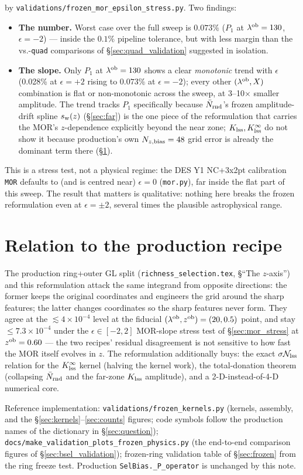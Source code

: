 \documentclass[a4paper, 11pt]{article}
\newcommand{\lob}{\lambda^{\rm ob}}
\newcommand{\zob}{z^{\rm ob}}
\newcommand{\Ncal}{\mathcal{N}}
\newcommand{\Nbar}{\bar{N}_{\rm rnd}}
\newcommand{\Klss}{K_{\rm lss}}
\newcommand{\KlssInf}{K_{\rm lss}^{\infty}}
\begin{document}
by \texttt{validations/frozen\_mor\_epsilon\_stress.py}. Two
findings:
\begin{itemize}
\item \textbf{The number.} Worst case over the full sweep is
      $0.073\%$ ($P_1$ at $\lob=130$, $\epsilon=-2$) --- inside the
      $0.1\%$ pipeline tolerance, but with less margin than the
      vs.-\texttt{quad} comparisons of \S\ref{sec:quad_validation}
      suggested in isolation.
\item \textbf{The slope.} Only $P_1$ at $\lob=130$ shows a clear
      \emph{monotonic} trend with $\epsilon$ (0.028\% at
      $\epsilon=+2$ rising to $0.073\%$ at $\epsilon=-2$); every
      other $(\lob,X)$ combination is flat or non-monotonic across
      the sweep, at 3--10$\times$ smaller amplitude. The trend tracks
      $P_1$ specifically because $\Nbar$'s frozen amplitude-drift
      spline $s_{\rm w}(z)$ (\S\ref{sec:far}) is the one piece of
      the reformulation that carries the MOR's $z$-dependence
      explicitly beyond the near zone; $\Klss,\KlssInf$ do not show
      it because production's own $N_{z,\rm bias}=48$ grid error is
      already the dominant term there (\S\ref{sec:relation}).
\end{itemize}
This is a stress test, not a physical regime: the DES Y1 NC+3x2pt
calibration \texttt{MOR} defaults to (and is centred near)
$\epsilon=0$ (\texttt{mor.py}), far inside the flat part of this
sweep. The result that matters is qualitative: nothing here breaks
the frozen reformulation even at $\epsilon=\pm2$, several times the
plausible astrophysical range.

\section{Relation to the production recipe}
\label{sec:relation}

The production ring+outer GL split
(\texttt{richness\_selection.tex}, \S``The $z$-axis'') and this
reformulation attack the same integrand from opposite directions:
the former keeps the original coordinates and engineers the grid
around the sharp features; the latter changes coordinates so the
sharp features never form. They agree at the
$\lesssim 4\times10^{-4}$ level at the fiducial
$(\lob,\zob)=(20,0.5)$ point, and stay $\le 7.3\times10^{-4}$
under the $\epsilon\in[-2,2]$ MOR-slope stress test of
\S\ref{sec:mor_stress} at $\zob=0.60$ --- the two recipes' residual
disagreement is not sensitive to how fast the MOR itself evolves in
$z$. The reformulation additionally
buys: the exact $\sigma\Ncal_{\rm lss}$ relation for the $\KlssInf$ kernel
(halving the kernel work), the total-donation theorem
(collapsing $\Nbar$ and the far-zone $\Klss$ amplitude), and a
2-D-instead-of-4-D numerical core.

Reference implementation:
\texttt{validations/frozen\_kernels.py} (kernels, assembly, and
the \S\ref{sec:kernels}--\ref{sec:counts} figures;
code symbols follow the production names of the dictionary in
\S\ref{sec:question});
\texttt{docs/make\_validation\_plots\_frozen\_physics.py} (the
end-to-end comparison figures of \S\ref{sec:bsel_validation});
frozen-ring validation table of \S\ref{sec:frozen} from the ring
freeze test. Production \texttt{SelBias.\_P\_operator} is
unchanged by this note.
\fi
\end{document}
